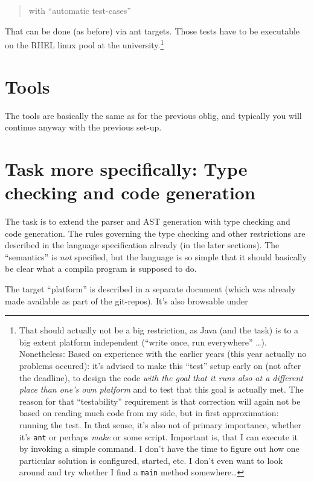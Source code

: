 \documentclass[11pt,freeform]{handout}[2014/08/13]
\begin{document}
\begin{quote}
  with ``automatic test-cases''
\end{quote}
That can be done (as before) via ant targets. Those tests have to be
executable on the RHEL linux pool at the university.\footnote{That should
  actually not be a big restriction, as Java (and the task) is to a big
  extent platform independent (``write once, run everywhere''
  \ldots). Nonetheless: Based on experience with the earlier years (this
  year actually no problems occured): it's advised to make this ``test''
  setup early on (not after the deadline), to design the code \emph{with
    the goal that it runs also at a different place than one's own
    platform} and to test that this goal is actually met. The reason for
  that ``testability'' requirement is that correction will again not be
  based on reading much code from my side, but in first approximation:
  running the test. In that sense, it's also not of primary importance,
  whether it's \texttt{ant} or perhaps \emph{make} or some
  script. Important is, that I can execute it by invoking a simple command.
  I don't have the time to figure out how one particular solution is
  configured, started, etc. I don't even want to look around and try
  whether I find a \texttt{main} method somewhere\ldots }


\section{Tools}


The tools are basically the same as for the previous oblig, and typically
you will continue anyway with the previous set-up. 




\section{Task more specifically: Type checking and code generation}
\label{sec:task-more-spec}



The task is to extend the parser and AST generation with type checking and
code generation. The rules governing the type checking and other
restrictions are described in the language specification already (in the
later sections). The ``semantics'' is \emph{not} specified, but the
language is so simple that it should basically be clear what a compila
program is supposed to do.

The target ``platform'' is described in a separate document (which was
already made available as part of the git-repos). It's also browsable under
\end{document}

